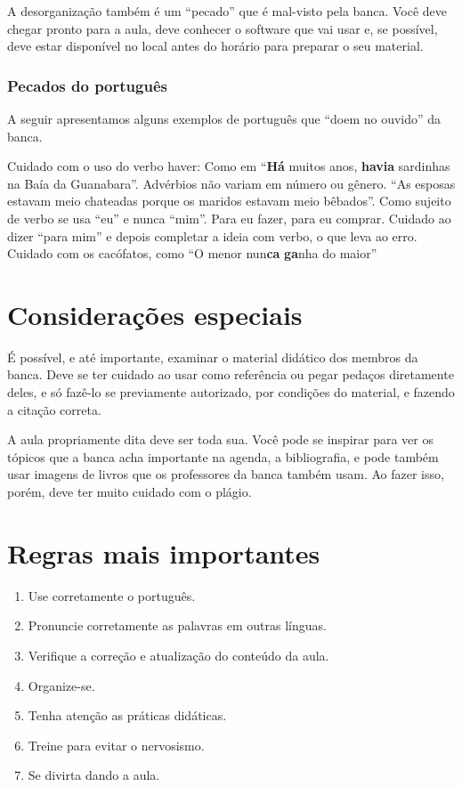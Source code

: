 \documentclass{article}
\begin{document}
A desorganização também é um ``pecado'' que é mal-visto pela banca. Você deve chegar pronto para a aula, deve conhecer o software que vai usar e, se possível, deve estar disponível no local antes do horário para preparar o seu material.





\subsubsection{Pecados do português}

A seguir apresentamos alguns exemplos de português que ``doem no ouvido'' da banca.
\begin{outline}
\1 Cuidado com o uso do verbo haver:
\2 Como em ``\textbf{Há} muitos anos, \textbf{havia} sardinhas na Baía da Guanabara''.
\1 Advérbios não variam em número ou gênero.
\2 ``As esposas estavam meio chateadas porque os maridos estavam meio bêbados''.
\1 Como sujeito de verbo se usa ``eu'' e nunca ``mim''. Para eu fazer, para eu comprar. Cuidado ao dizer ``para mim'' e depois  completar a ideia com verbo, o que leva ao erro.
\1 Cuidado com os cacófatos, como ``O menor nun\textbf{ca} \textbf{ga}nha do maior''
\end{outline}

\section{Considerações especiais}

É possível, e até importante,  examinar o material didático dos membros da banca. Deve se ter cuidado ao usar como referência ou pegar pedaços diretamente deles, e só fazê-lo se previamente autorizado, por condições do material, e fazendo a citação correta.

A aula propriamente dita deve ser toda sua. Você pode se inspirar para ver os tópicos que a banca acha importante na agenda, a bibliografia, e pode também usar imagens de livros que os professores da banca também usam. Ao fazer isso, porém, deve ter muito cuidado com o plágio.

\section{Regras mais importantes}

\begin{enumerate}
\item Use corretamente o português.
\item Pronuncie corretamente as palavras em outras línguas.
\item Verifique a correção e atualização do conteúdo da aula.
\item Organize-se.
\item Tenha atenção as práticas didáticas.
\item Treine para evitar o nervosismo.
\item Se divirta dando a aula.
\end{enumerate}
\end{document}

